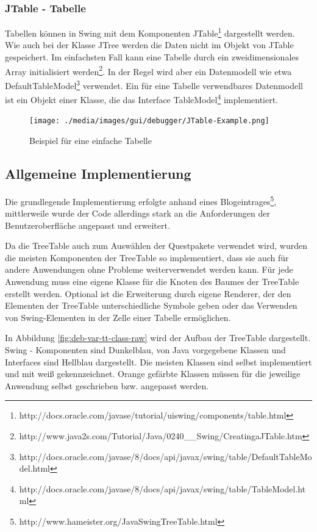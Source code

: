 \subsubsection*{JTable - Tabelle}
Tabellen können in Swing mit dem Komponenten JTable\footnote{http://docs.oracle.com/javase/tutorial/uiswing/components/table.html} dargestellt werden. Wie auch bei der Klasse JTree werden die Daten nicht im Objekt von JTable gespeichert. Im einfachsten Fall kann eine Tabelle durch ein zweidimensionales Array initialisiert werden\footnote{http://www.java2s.com/Tutorial/Java/0240\_\_Swing/CreatingaJTable.htm}. In der Regel wird aber ein Datenmodell wie etwa DefaultTableModel\footnote{http://docs.oracle.com/javase/8/docs/api/javax/swing/table/DefaultTableModel.html} verwendet. Ein für eine Tabelle verwendbares Datenmodell ist ein Objekt einer Klasse, die das Interface TableModel\footnote{http://docs.oracle.com/javase/8/docs/api/javax/swing/table/TableModel.html} implementiert.

\begin{figure}[h]
\centering
\texttt{[image: ./media/images/gui/debugger/JTable-Example.png]}
\caption{Beispiel für eine einfache Tabelle}
\label{fig:deb-tt-example-jtable}
\end{figure}


\subsection{Allgemeine Implementierung}
Die grundlegende Implementierung erfolgte anhand eines Blogeintrages\footnote{http://www.hameister.org/JavaSwingTreeTable.html}, mittlerweile wurde der Code allerdings stark an die Anforderungen der Benutzeroberfläche angepasst und erweitert.

Da die TreeTable auch zum Auswählen der Questpakete verwendet wird, wurden die meisten Komponenten der TreeTable so implementiert, dass sie auch für andere Anwendungen ohne Probleme weiterverwendet werden kann. Für jede Anwendung muss eine eigene Klasse für die Knoten des Baumes der TreeTable erstellt werden. Optional ist die Erweiterung durch eigene Renderer, der den Elementen der TreeTable unterschiedliche Symbole geben oder das Verwenden von Swing-Elementen in der Zelle einer Tabelle ermöglichen.

In Abbildung \ref{fig:deb-var-tt-class-raw} wird der Aufbau der TreeTable dargestellt. Swing - Komponenten sind Dunkelblau, von Java vorgegebene Klassen und Interfaces sind Hellblau dargestellt. Die meisten Klassen sind selbst implementiert und mit weiß gekennzeichnet. Orange gefärbte Klassen müssen für die jeweilige Anwendung selbst geschrieben bzw. angepasst werden.

